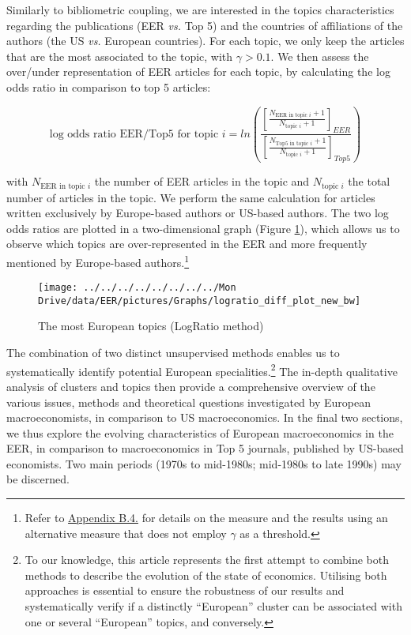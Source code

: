 \documentclass[
  12pt,
  onecolumn]{article}
\begin{document}
Similarly to bibliometric coupling, we are interested in the topics
characteristics regarding the publications (EER \emph{vs.} Top 5) and
the countries of affiliations of the authors (the US \emph{vs.} European
countries). For each topic, we only keep the articles that are the most
associated to the topic, with \(\gamma > 0.1\). We then assess the
over/under representation of EER articles for each topic, by calculating
the log odds ratio in comparison to top 5 articles:

\[
\text{log odds ratio EER/Top5 for topic }i = ln(\frac{[\frac{N_{\text{EER in topic }i}+1}{N_{\text{topic }i} + 1}]_{EER}}{[\frac{N_{\text{Top5 in topic }i}+1}{N_{\text{topic }i} + 1}]_{Top5}})
\]

with \(N_{\text{EER in topic }i}\) the number of EER articles in the
topic and \(N_{\text{topic }i}\) the total number of articles in the
topic. We perform the same calculation for articles written exclusively
by Europe-based authors or US-based authors. The two log odds ratios are
plotted in a two-dimensional graph (Figure \ref{fig:plot-topic-diff}),
which allows us to observe which topics are over-represented in the EER
and more frequently mentioned by Europe-based authors.\footnote{Refer to
  \protect\hyperlink{topic}{Appendix B.4.} for details on the measure
  and the results using an alternative measure that does not employ
  \(\gamma\) as a threshold.}

\begin{figure}[h]

{\centering \texttt{[image: ../../../../../../../../Mon Drive/data/EER/pictures/Graphs/logratio\_diff\_plot\_new\_bw]} 

}

\caption{The most European topics (LogRatio method)}\label{fig:plot-topic-diff}
\end{figure}

\bigskip

The combination of two distinct unsupervised methods enables us to
systematically identify potential European specialities.\footnote{To our
  knowledge, this article represents the first attempt to combine both
  methods to describe the evolution of the state of economics. Utilising
  both approaches is essential to ensure the robustness of our results
  and systematically verify if a distinctly ``European'' cluster can be
  associated with one or several ``European'' topics, and conversely.}
The in-depth qualitative analysis of clusters and topics then provide a
comprehensive overview of the various issues, methods and theoretical
questions investigated by European macroeconomists, in comparison to US
macroeconomics. In the final two sections, we thus explore the evolving
characteristics of European macroeconomics in the EER, in comparison to
macroeconomics in Top 5 journals, published by US-based economists. Two
main periods (1970s to mid-1980s; mid-1980s to late 1990s) may be
discerned.
\end{document}
